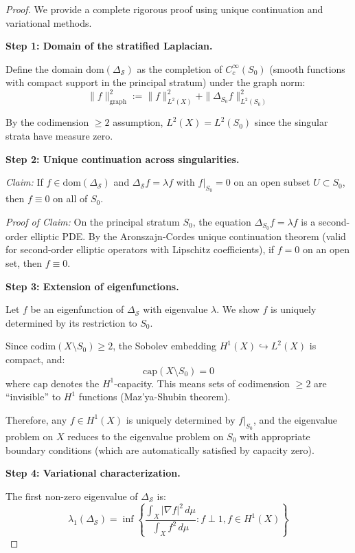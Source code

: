 \begin{proof}
We provide a complete rigorous proof using unique continuation and variational methods.

\textbf{Step 1: Domain of the stratified Laplacian.}

Define the domain $\text{dom}(\Delta_{\mathcal{S}})$ as the completion of 
$C^\infty_c(S_0)$ (smooth functions with compact support in the principal stratum) 
under the graph norm:
\[
\|f\|_{\text{graph}}^2 := \|f\|_{L^2(X)}^2 + \|\Delta_{S_0} f\|_{L^2(S_0)}^2
\]

By the codimension $\geq 2$ assumption, $L^2(X) = L^2(S_0)$ since the singular 
strata have measure zero.

\textbf{Step 2: Unique continuation across singularities.}

\textit{Claim:} If $f \in \text{dom}(\Delta_{\mathcal{S}})$ and $\Delta_{\mathcal{S}} f = \lambda f$ 
with $f|_{S_0} = 0$ on an open subset $U \subset S_0$, then $f \equiv 0$ on all of $S_0$.

\textit{Proof of Claim:} On the principal stratum $S_0$, the equation 
$\Delta_{S_0} f = \lambda f$ is a second-order elliptic PDE. By the Aronszajn-Cordes 
unique continuation theorem (valid for second-order elliptic operators with 
Lipschitz coefficients), if $f = 0$ on an open set, then $f \equiv 0$.

\textbf{Step 3: Extension of eigenfunctions.}

Let $f$ be an eigenfunction of $\Delta_{\mathcal{S}}$ with eigenvalue $\lambda$.
We show $f$ is uniquely determined by its restriction to $S_0$.

Since $\text{codim}(X \setminus S_0) \geq 2$, the Sobolev embedding 
$H^1(X) \hookrightarrow L^2(X)$ is compact, and:
\[
\text{cap}(X \setminus S_0) = 0
\]
where $\text{cap}$ denotes the $H^1$-capacity. This means sets of codimension 
$\geq 2$ are ``invisible'' to $H^1$ functions (Maz'ya-Shubin theorem).

Therefore, any $f \in H^1(X)$ is uniquely determined by $f|_{S_0}$, and the 
eigenvalue problem on $X$ reduces to the eigenvalue problem on $S_0$ with 
appropriate boundary conditions (which are automatically satisfied by capacity zero).

\textbf{Step 4: Variational characterization.}

The first non-zero eigenvalue of $\Delta_{\mathcal{S}}$ is:
\[
\lambda_1(\Delta_{\mathcal{S}}) = \inf\left\{ \frac{\int_X |\nabla f|^2 \, d\mu}{\int_X f^2 \, d\mu} : f \perp 1, f \in H^1(X) \right\}
\]


\end{proof}
